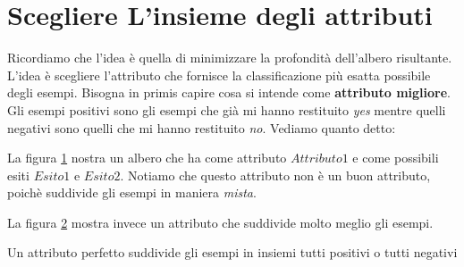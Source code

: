 \section{Scegliere L'insieme degli attributi}
Ricordiamo che l'idea è quella di minimizzare la profondità dell'albero risultante. L'idea è scegliere l'attributo che fornisce la classificazione più esatta possibile degli esempi.
Bisogna in primis capire cosa si intende come \textbf{attributo migliore}.
Gli esempi positivi sono gli esempi che già mi hanno restituito \textit{yes} mentre quelli negativi sono quelli che mi hanno restituito \textit{no}.
Vediamo quanto detto:
\begin{figure}[H]
  \centering
  \label{Albero1}
\end{figure}
La figura \ref{Albero1} nostra un albero che ha come attributo $Attributo1$ e come possibili esiti $Esito1$ e $Esito2$. Notiamo che questo attributo non è un buon attributo, poichè suddivide gli esempi in maniera \textit{mista}.
\begin{figure}[H]
  \centering
  \label{Albero2}
\end{figure}
La figura \ref{Albero2} mostra invece un attributo che suddivide molto meglio gli esempi.
\begin{definizione}
  Un attributo perfetto suddivide gli esempi in insiemi tutti positivi o tutti negativi
\end{definizione}

